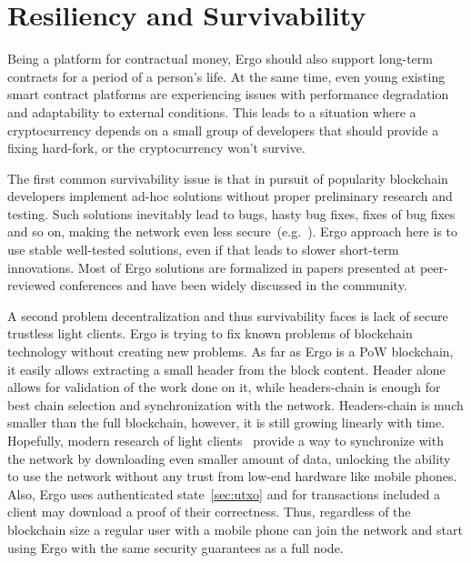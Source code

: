 \section{Resiliency and Survivability}
\label{sec:survivability}

Being a platform for contractual money, Ergo should also support long-term contracts for a
period of a person's life.
At the same time, even young existing smart contract platforms are experiencing issues with performance degradation and
adaptability to external conditions.
This leads to a situation where a cryptocurrency depends on a small group of developers
that should provide a fixing hard-fork, or the cryptocurrency won't survive.

The first common survivability issue is that in pursuit of popularity blockchain developers implement ad-hoc
solutions without proper preliminary research and testing.
Such solutions inevitably lead to bugs, hasty bug fixes, fixes of bug fixes and so on, making the network even less secure~(e.g.~\cite{IOTA}).
Ergo approach here is to use stable well-tested solutions, even if that leads to slower
short-term innovations.
Most of Ergo solutions are formalized in papers presented at peer-reviewed conferences
and have been widely discussed in the community.

A second problem decentralization and thus survivability faces is lack of secure trustless light clients.
Ergo is trying to fix known problems of blockchain technology without creating new problems.
As far as Ergo is a PoW blockchain, it easily allows extracting a small header from the block content.
Header alone allows for validation of the work done on it, while headers-chain is enough for best chain selection
and synchronization with the network.
Headers-chain is much smaller than the full blockchain, however, it is still growing linearly with time.
Hopefully, modern research of light clients~\cite{kiayias2017non,luuflyclient} provide a way to
synchronize with the network by downloading even smaller amount of data, unlocking the ability to
use the network without any trust from low-end hardware like mobile phones.
Also, Ergo uses authenticated state~\ref{sec:utxo} and for transactions included
a client may download a proof of their correctness.
Thus, regardless of the blockchain size a regular user with
a mobile phone can join the network and start using Ergo with the same security
guarantees as a full node.

